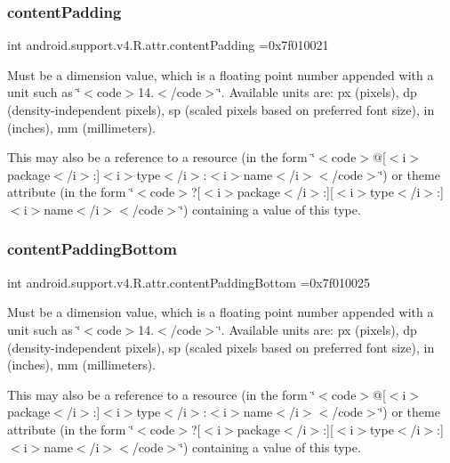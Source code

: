 \subsubsection{\texorpdfstring{content\+Padding}{contentPadding}}
{\footnotesize\ttfamily int android.\+support.\+v4.\+R.\+attr.\+content\+Padding =0x7f010021\hspace{0.3cm}{\ttfamily [static]}}

Must be a dimension value, which is a floating point number appended with a unit such as \char`\"{}$<$code$>$14.\+5sp$<$/code$>$\char`\"{}. Available units are\+: px (pixels), dp (density-\/independent pixels), sp (scaled pixels based on preferred font size), in (inches), mm (millimeters). 

This may also be a reference to a resource (in the form \char`\"{}$<$code$>$@\mbox{[}$<$i$>$package$<$/i$>$\+:\mbox{]}$<$i$>$type$<$/i$>$\+:$<$i$>$name$<$/i$>$$<$/code$>$\char`\"{}) or theme attribute (in the form \char`\"{}$<$code$>$?\mbox{[}$<$i$>$package$<$/i$>$\+:\mbox{]}\mbox{[}$<$i$>$type$<$/i$>$\+:\mbox{]}$<$i$>$name$<$/i$>$$<$/code$>$\char`\"{}) containing a value of this type. \mbox{\label{classandroid_1_1support_1_1v4_1_1R_1_1attr_ac85f05250c0d2d5292eeff7d7eb0f798}} 
\subsubsection{\texorpdfstring{content\+Padding\+Bottom}{contentPaddingBottom}}
{\footnotesize\ttfamily int android.\+support.\+v4.\+R.\+attr.\+content\+Padding\+Bottom =0x7f010025\hspace{0.3cm}{\ttfamily [static]}}

Must be a dimension value, which is a floating point number appended with a unit such as \char`\"{}$<$code$>$14.\+5sp$<$/code$>$\char`\"{}. Available units are\+: px (pixels), dp (density-\/independent pixels), sp (scaled pixels based on preferred font size), in (inches), mm (millimeters). 

This may also be a reference to a resource (in the form \char`\"{}$<$code$>$@\mbox{[}$<$i$>$package$<$/i$>$\+:\mbox{]}$<$i$>$type$<$/i$>$\+:$<$i$>$name$<$/i$>$$<$/code$>$\char`\"{}) or theme attribute (in the form \char`\"{}$<$code$>$?\mbox{[}$<$i$>$package$<$/i$>$\+:\mbox{]}\mbox{[}$<$i$>$type$<$/i$>$\+:\mbox{]}$<$i$>$name$<$/i$>$$<$/code$>$\char`\"{}) containing a value of this type. \mbox{\label{classandroid_1_1support_1_1v4_1_1R_1_1attr_a8968321b1f9c0babb9646f431ece6294}} 
